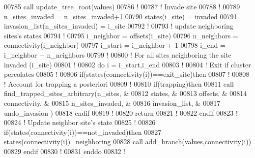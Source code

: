 \begin{DoxyCode}
00785        call update\_tree\_root(values)
00786        \textcolor{comment}{!}
00787        \textcolor{comment}{! Invade site}
00788        \textcolor{comment}{!}
00789        n\_sites\_invaded = n\_sites\_invaded+1
00790        states(i\_site) = invaded
00791        invasion\_list(n\_sites\_invaded) = i\_site
00792        \textcolor{comment}{!}
00793        \textcolor{comment}{! update neighboring sites's states}
00794        \textcolor{comment}{!}
00795        i\_neighbor = offsets(i\_site)
00796        n\_neighbors = connectivity(i\_neighbor)
00797        i\_start = i\_neighbor + 1
00798        i\_end   = i\_neighbor + n\_neighbors
00799        \textcolor{comment}{!}
00800        \textcolor{comment}{! For all sites neighboring the site invaded (i\_site)}
00801        \textcolor{comment}{!}
00802        \textcolor{keyword}{do} i = i\_start,i\_end
00803           \textcolor{comment}{!}
00804           \textcolor{comment}{! Exit if cluster percolates}
00805           \textcolor{comment}{!}
00806           \textcolor{keyword}{if}(states(connectivity(i))==exit\_site)\textcolor{keyword}{then} 
00807              \textcolor{comment}{!}
00808              \textcolor{comment}{! Account for trapping a posteriori}
00809              \textcolor{comment}{!}
00810              \textcolor{keyword}{if}(trapping)\textcolor{keyword}{then}
00811                 call find\_trapped\_sites\_arbitrary(n\_sites,           &
00812                                                   states,            &
00813                                                   offsets,           &
00814                                                   connectivity,      &
00815                                                   n\_sites\_invaded,   &
00816                                                   invasion\_list,     &
00817                                                   undo\_invasion      )
00818              \textcolor{keyword}{endif}
00819              \textcolor{comment}{!}
00820              return
00821              \textcolor{comment}{! }
00822           \textcolor{keyword}{endif}
00823           \textcolor{comment}{!}
00824           \textcolor{comment}{! Update neighbor site's state}
00825           \textcolor{comment}{!}
00826           \textcolor{keyword}{if}(states(connectivity(i))==not\_invaded)\textcolor{keyword}{then}
00827              states(connectivity(i))=neighboring
00828              call add\_branch(values,connectivity(i))
00829           \textcolor{keyword}{endif}
00830           \textcolor{comment}{!}
00831        \textcolor{keyword}{enddo}
00832        \textcolor{comment}{!}

\end{DoxyCode}
